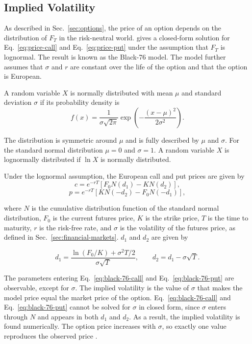 \subsection{Implied Volatility}\label{sec:implied-vol}
As described in Sec.~\ref{sec:options}, the price of an option depends on the distribution of $F_T$ in the risk-neutral world. \textcite{blackPricingCommodityContracts1976} gives a closed-form solution for Eq.~\eqref{eq:price-call} and Eq.~\eqref{eq:price-put} under the assumption that $F_T$ is lognormal. The result is known as the Black-76 model. The model further assumes that $\sigma$ and $r$ are constant over the life of
the option and that the option is European. 

A random variable $X$ is normally distributed with mean $\mu$ and standard deviation $\sigma$ if its probability density is
\begin{equation}
f(x) = \frac{1}{\sigma \sqrt{2\pi}}
       \exp\left(-\frac{(x-\mu)^2}{2\sigma^2}\right).
\end{equation}

The distribution is symmetric around $\mu$ and is fully described by $\mu$ and $\sigma$. For the standard normal distribution $\mu = 0$ and $\sigma = 1$. A random variable $X$ is lognormally distributed if $\ln X$ is normally distributed. 

Under the lognormal assumption, the European call and put prices are given by
\begin{equation}
c = e^{-rT} \left[ F_0 N(d_1) - K N(d_2) \right],
\label{eq:black-76-call}
\end{equation}
\begin{equation}
p = e^{-rT} \left[ K N(-d_2) - F_0 N(-d_1) \right],
\label{eq:black-76-put}
\end{equation}

where $N$ is the cumulative distribution function of the standard normal distribution, $F_0$ is the current futures price, $K$ is the strike price, $T$ is the time to maturity, $r$ is the risk-free rate, and $\sigma$ is the volatility of the futures price, as defined in Sec.~\ref{sec:financial-markets}. $d_1$ and $d_2$ are given by

\begin{equation}
d_1 = \frac{\ln(F_0/K) + \sigma^2 T/2}{\sigma \sqrt{T}}, \qquad
d_2 = d_1 - \sigma \sqrt{T}.
\end{equation}

The parameters entering Eq.~\eqref{eq:black-76-call} and Eq.~\eqref{eq:black-76-put} are observable, except for $\sigma$. The implied volatility is the value of $\sigma$ that makes the model price
equal the market price of the option. Eq.~\eqref{eq:black-76-call} and Eq.~\eqref{eq:black-76-put} cannot be solved for $\sigma$ in closed form, since $\sigma$ enters through $N$ and appears in both $d_1$ and $d_2$. As a result, the implied volatility is found numerically. The option price increases with $\sigma$, so exactly one value reproduces the observed price \parencite[358]{hullOptionsFuturesOther2022}.

